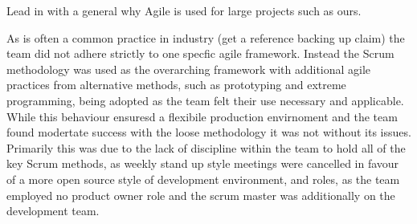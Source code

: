 \documentclass{l3proj}
\begin{document}
%
%
%



Lead in with a general why Agile is used for large projects such as ours.

As is often a common practice in industry (get a reference backing up claim) the team did not adhere strictly to one specfic agile framework. Instead the Scrum methodology was used as the overarching framework with additional agile practices from alternative methods, such as prototyping and extreme programming, being adopted as the team felt their use necessary and applicable. While this behaviour ensuresd a flexibile production envirnoment and the team found modertate success with the loose methodology it was not without its issues. Primarily this was due to the lack of discipline within the team to hold all of the key Scrum methods, as weekly stand up style meetings were cancelled in favour of a more open source style of development environment, and roles, as the team employed no product owner role and the scrum master was additionally on the development team. 
\end{document}
